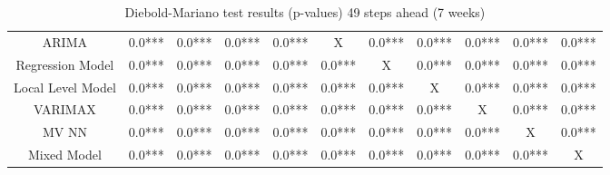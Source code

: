 \begin{landscape}
\begin{table}[]
\begin{tabular}{|c|c c c c c c c c c c|}
        ARIMA & 0.0*** & 0.0*** & 0.0*** & 0.0*** & X & 0.0*** & 0.0*** & 0.0*** & 0.0*** & 0.0***\\
        Regression Model & 0.0*** & 0.0*** & 0.0*** & 0.0*** & 0.0*** & X & 0.0*** & 0.0*** & 0.0*** & 0.0***\\
        Local Level Model & 0.0*** & 0.0*** & 0.0*** & 0.0*** & 0.0*** & 0.0*** & X & 0.0*** & 0.0*** & 0.0***\\
        VARIMAX & 0.0*** & 0.0*** & 0.0*** & 0.0*** & 0.0*** & 0.0*** & 0.0*** & X & 0.0*** & 0.0***\\
        MV NN & 0.0*** & 0.0*** & 0.0*** & 0.0*** & 0.0*** & 0.0*** & 0.0*** & 0.0*** & X & 0.0***\\
        Mixed Model & 0.0*** & 0.0*** & 0.0*** & 0.0*** & 0.0*** & 0.0*** & 0.0*** & 0.0*** & 0.0*** & X\\
    \hline
    \end{tabular}
    \caption{Diebold-Mariano test results (p-values) 49 steps ahead (7 weeks)}
    \label{tab:7 weeks ahead dm}
\end{table}
\end{landscape}